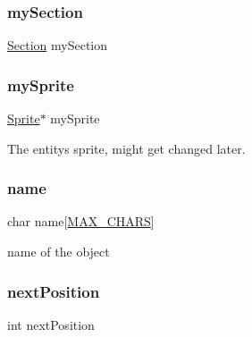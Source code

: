 \subsubsection{\texorpdfstring{my\+Section}{mySection}}
{\footnotesize\ttfamily \hyperlink{entity__s_8h_a74c066b9a2662a48095c47acf5debac4}{Section} my\+Section}

\mbox{\label{structentity__s_a09530f21303b5dbd659855de69a51e0c}} 
\subsubsection{\texorpdfstring{my\+Sprite}{mySprite}}
{\footnotesize\ttfamily \hyperlink{gf2d__sprite_8h_a85b5a622f08c587d1f33fd504a24416e}{Sprite}$\ast$ my\+Sprite}



The entity\textquotesingle{}s sprite, might get changed later. 

\mbox{\label{structentity__s_a1a416c8de05eed27aa81f653426597d8}} 
\subsubsection{\texorpdfstring{name}{name}}
{\footnotesize\ttfamily char name\mbox{[}\hyperlink{entity__s_8h_a8adbf2b1e0569dded992fee665e86e70}{M\+A\+X\+\_\+\+C\+H\+A\+RS}\mbox{]}}



name of the object 

\mbox{\label{structentity__s_a3ce77101c89cf9167be88f050bd42f72}} 
\subsubsection{\texorpdfstring{next\+Position}{nextPosition}}
{\footnotesize\ttfamily int next\+Position}

\mbox{\label{structentity__s_a4585fbbdf8aed52da0855955d1a462ad}} 
